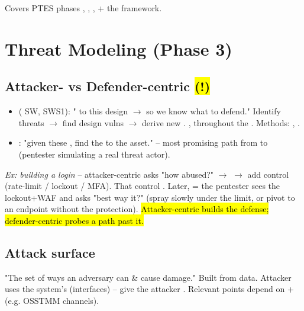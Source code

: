 

Covers PTES phases , , ,  + the  framework.

\section{Threat Modeling (Phase 3)}

\subsection{Attacker- vs Defender-centric \hl{(!)}}
\begin{itemize}
\item {} ( SW, SWS1): " to this design $\to$ so we know what to defend." Identify threats $\to$ find design vulns $\to$ derive new . , throughout the . Methods: , .
\item {}: "given these , find the  to the asset."  -- most promising path from  to  (pentester simulating a real threat actor).
\end{itemize}
\textit{Ex: building a login} -- attacker-centric asks "how abused?" $\to$  $\to$ add control (rate-limit / lockout / MFA). That control . Later,  = the pentester sees the lockout+WAF and asks "best way  it?" (spray slowly under the limit, or pivot to an endpoint without the protection). \hl{Attacker-centric builds the defense; defender-centric probes a path past it.}

\subsection{Attack surface}
"The set of ways an adversary can  \& cause damage." Built from  data. Attacker uses the system's  (interfaces) --  give the attacker . Relevant points depend on  +  (e.g. OSSTMM channels).

